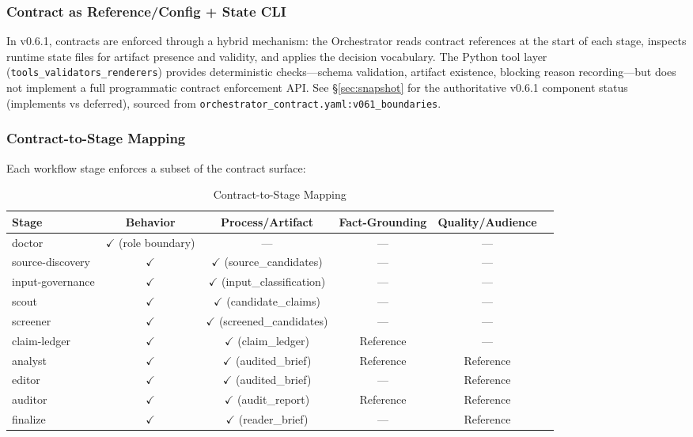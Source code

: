 \documentclass[11pt,a4paper]{article}
\begin{document}
\subsubsection{Contract as Reference/Config + State CLI}

In v0.6.1, contracts are enforced through a hybrid mechanism: the Orchestrator reads contract references at the start of each stage, inspects runtime state files for artifact presence and validity, and applies the decision vocabulary. The Python tool layer (\texttt{tools\_validators\_renderers}) provides deterministic checks---schema validation, artifact existence, blocking reason recording---but does not implement a full programmatic contract enforcement API. See \S\ref{sec:snapshot} for the authoritative v0.6.1 component status (implements vs deferred), sourced from \texttt{orchestrator\_contract.yaml:v061\_boundaries}.

\subsubsection{Contract-to-Stage Mapping}

Each workflow stage enforces a subset of the contract surface:

\begin{table}[ht]
\centering
\caption{Contract-to-Stage Mapping}
\label{tab:contract-stage}
\footnotesize
\begin{tabular}{@{}lccccc@{}}
\toprule
\textbf{Stage} & \textbf{Behavior} & \textbf{Process/Artifact} & \textbf{Fact-Grounding} & \textbf{Quality/Audience} \\
\midrule
doctor & $\checkmark$ (role boundary) & --- & --- & --- \\
source-discovery & $\checkmark$ & $\checkmark$ (source\_candidates) & --- & --- \\
input-governance & $\checkmark$ & $\checkmark$ (input\_classification) & --- & --- \\
scout & $\checkmark$ & $\checkmark$ (candidate\_claims) & --- & --- \\
screener & $\checkmark$ & $\checkmark$ (screened\_candidates) & --- & --- \\
claim-ledger & $\checkmark$ & $\checkmark$ (claim\_ledger) & Reference & --- \\
analyst & $\checkmark$ & $\checkmark$ (audited\_brief) & Reference & Reference \\
editor & $\checkmark$ & $\checkmark$ (audited\_brief) & --- & Reference \\
auditor & $\checkmark$ & $\checkmark$ (audit\_report) & Reference & Reference \\
finalize & $\checkmark$ & $\checkmark$ (reader\_brief) & --- & Reference \\
\bottomrule
\end{tabular}
\end{table}
\end{document}
